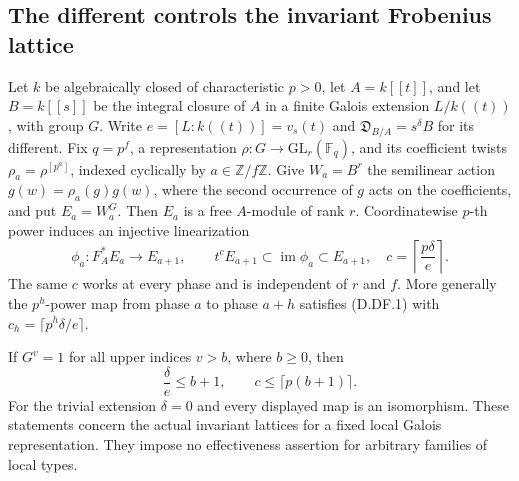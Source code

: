 \subsection{The different controls the invariant Frobenius lattice}

\begin{lemma}
\label{D:different-Frobenius-invariant-lattice}
Let $k$ be algebraically closed of characteristic $p>0$, let
$A=k[[t]]$, and let $B=k[[s]]$ be the integral closure of $A$
in a finite Galois extension $L/k((t))$, with group $G$.
Write $e=[L:k((t))]=v_s(t)$ and
$\mathfrak D_{B/A}=s^\delta B$ for its different.
Fix $q=p^f$, a representation $\rho:G\to\mathrm{GL}_r(\mathbb F_q)$,
and its coefficient twists $\rho_a=\rho^{[p^a]}$, indexed
cyclically by $a\in\mathbb Z/f\mathbb Z$.
Give $W_a=B^r$ the semilinear action
$g(w)=\rho_a(g)g(w)$, where the second occurrence of $g$
acts on the coefficients, and put $E_a=W_a^G$.
Then $E_a$ is a free $A$-module of rank $r$.
Coordinatewise $p$-th power induces an injective linearization
\[
 \phi_a:F_A^*E_a\longrightarrow E_{a+1},\qquad
 t^cE_{a+1}\subset\operatorname{im}\phi_a\subset E_{a+1},
 \quad c=\left\lceil\frac{p\delta}{e}\right\rceil .
 \tag{D.DF.1}
\]
The same $c$ works at every phase and is independent of $r$ and $f$.
More generally the $p^h$-power map from phase $a$ to phase $a+h$
satisfies (D.DF.1) with $c_h=\lceil p^h\delta/e\rceil$.

If $G^v=1$ for all upper indices $v>b$, where $b\ge0$, then
\[
                 \frac\delta e\le b+1,
       \qquad c\le\lceil p(b+1)\rceil.                 \tag{D.DF.2}
\]
For the trivial extension $\delta=0$ and every displayed map
is an isomorphism. These statements concern the actual invariant
lattices for a fixed local Galois representation. They impose no
effectiveness assertion for arbitrary families of local types.
\end{lemma}


